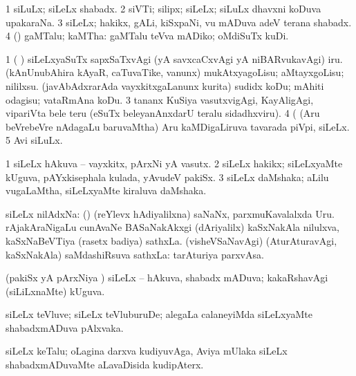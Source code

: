 \bentry
{}
\gl{\nA}
\expl{}
\bmng
\bnum
\num{1} siLuLx; siLeLx shabadx. 
\num{2} siVTi; silipx; siLeLx; siLuLx dhavxni koDuva upakaraNa. 
\num{3} siLeLx; hakikx, gALi, kiSxpaNi, \mo vu mADuva adeV terana shabadx. 
\num{4} (\AmA) gaMTalu; kaMTha:  gaMTalu teVva mADiko; oMdiSuTx kuDi. 
\enum
\emng

\noindent 
\gl{\pagu}
\bmng
\bnum
\num{1}  (   )  siLeLxyaSuTx sapxSaTxvAgi (yA savxcaCxvAgi yA niBARvukavAgi) iru. 
  
\banum
{} (kAnUnubAhira kAyaR, caTuvaTike, \mo vanunx) mukAtxyagoLisu; aMtayxgoLisu; nililxsu. 
 (javAbAdxrarAda vayxkitxgaLanunx kurita) sudidx koDu; mAhiti odagisu; vataRmAna koDu. 
\eanum
\numie
\num{3}  tananx KuSiya vasutxvigAgi, KayAligAgi, vipariVta bele teru (eSuTx beleyanAnxdarU teralu sidadhxviru). 
\num{4}  (  (Aru beVrebeVre nAdagaLu baruvaMtha) Aru kaMDigaLiruva tavarada piVpi, siLeLx. 
\num{5}  Avi siLuLx. 
\enum
\emng
\eentry

\bentry 
{}
\gl{\nA}
\bmng
\bnum
\num{1} siLeLx hAkuva -- vayxkitx, pArxNi yA vasutx. 
\num{2} siLeLx hakikx; siLeLxyaMte kUguva, pAYxkisephala kulada, yAvudeV pakiSx. 
\num{3} siLeLx daMshaka; aLilu \mo vugaLaMtha, siLeLxyaMte kiraluva daMshaka. 
\enum
\emng
\eentry

\bentry
{} 
\gl{\nA}
\expl{}
\bmng
siLeLx nilAdxNa: 
\banum
{} (\ame) (reYlevx hAdiyalilxna) saNaNx, parxmuKavalalxda Uru. 
 rAjakAraNigaLu cunAvaNe BASaNakAkxgi (dAriyalilx) kaSxNakAla nilulxva, kaSxNaBeVTiya (rasetx badiya) sathxLa. 
 (visheVSaNavAgi) (AturAturavAgi, kaSxNakAla) saMdashiRsuva sathxLa:  tarAturiya parxvAsa. 
\eanum
\emng
\eentry

\bentry
{} 
\gl{\gu}
\expl{}
\bmng
(pakiSx yA pArxNiya \vi) siLeLx -- hAkuva, shabadx mADuva; kakaRshavAgi (siLiLxnaMte) kUguva. 
\emng
\eentry

\bentry
{} 
\gl{\nA}
\expl{}
\bmng
siLeLx teVluve; siLeLx teVluburuDe; alegaLa calaneyiMda siLeLxyaMte shabadxmADuva pAlxvaka. 
\emng
\eentry

\bentry
{}
\gl{\nA}
\bmng
siLeLx keTalu; oLagina darxva kudiyuvAga, Aviya mUlaka siLeLx shabadxmADuvaMte aLavaDisida kudipAterx. 
\emng
\eentry

